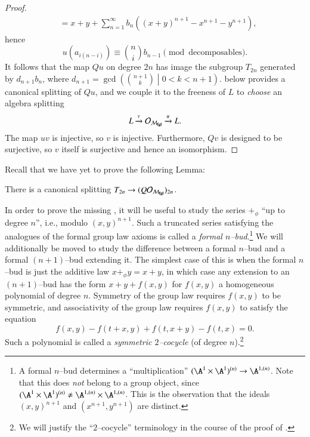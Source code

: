 \begin{proof}
\begin{align*}
& = x + y + \sum_{n=1}^\infty b_n ((x+y)^{n+1} - x^{n+1} - y^{n+1}),
\end{align*}
hence \[u(a_{i(n-i)}) \equiv \binom{n}{i} b_{n-1} \pmod{\text{decomposables}}.\]  It follows that the map $Qu$ on degree $2n$ has image the subgroup $T_{2n}$ generated by $d_{n+1} b_n$, where $d_{n+1} = \gcd\left( \binom{n+1}{k} \middle| 0 < k < n + 1 \right)$.   below provides a canonical splitting of $Qu$, and we couple it to the freeness of $L$ to \emph{choose} an algebra splitting \[L \xrightarrow{v} \mathcal{O}_{\mathcal{M}_{\mathbf{fgl}}} \xrightarrow{u} L.\]  The map $uv$ is injective, so $v$ is injective.  Furthermore, $Qv$ is designed to be surjective, so $v$ itself is surjective and hence an isomorphism.
\end{proof}

Recall that we have yet to prove the following Lemma:

\begin{lemma}\label{LazardSplittingLemma}
There is a canonical splitting $T_{2n} \to (Q \mathcal O_{\mathcal{M}_{\mathbf{fgl}}})_{2n}$.
\end{lemma}

\begin{definition}\label{DefinitionSymmetric2Cocycle}
In order to prove the missing , it will be useful to study the series $+_\phi$ ``up to degree $n$'', i.e., modulo $(x, y)^{n+1}$.  Such a truncated series satisfying the analogues of the formal group law axioms is called a \textit{formal $n$--bud}.\footnote{A formal $n$--bud determines a ``multiplication'' $(\A^1 \times \A^1)^{(n)} \to \A^{1,(n)}$.  Note that this does \emph{not} belong to a group object, since $(\A^1 \times \A^1)^{(n)} \not\simeq \A^{1,(n)} \times \A^{1,(n)}$.  This is the observation that the ideals $(x, y)^{n+1}$ and $(x^{n+1}, y^{n+1})$ are distinct.}  We will additionally be moved to study the difference between a formal $n$--bud and a formal $(n+1)$--bud extending it.  The simplest case of this is when the formal $n$--bud is just the additive law $x +_\phi y = x + y$, in which case any extension to an $(n+1)$--bud has the form $x + y + f(x, y)$ for $f(x, y)$ a homogeneous polynomial of degree $n$.  Symmetry of the group law requires $f(x, y)$ to be symmetric, and associativity of the group law requires $f(x, y)$ to satisfy the equation \[f(x, y) - f(t + x, y) + f(t, x + y) - f(t, x) = 0.\]  Such a polynomial is called a \textit{symmetric $2$--cocycle} (of degree $n$).\footnote{We will justify the ``$2$--cocycle'' terminology in the course of the proof of .}
\end{definition}

